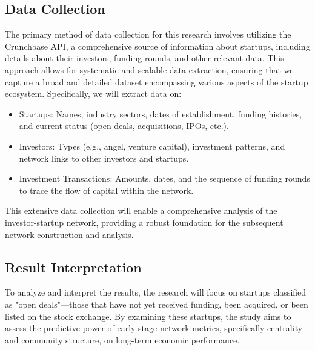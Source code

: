 \documentclass[a4paper,11pt]{article}
\begin{document}
\subsection{Data Collection}
The primary method of data collection for this research involves utilizing the Crunchbase API, a comprehensive source of information about startups, including details about their investors, funding rounds, and other relevant data. This approach allows for systematic and scalable data extraction, ensuring that we capture a broad and detailed dataset encompassing various aspects of the startup ecosystem. Specifically, we will extract data on:
\begin{itemize}
    \item Startups: Names, industry sectors, dates of establishment, funding histories, and current status (open deals, acquisitions, IPOs, etc.).
    \item Investors: Types (e.g., angel, venture capital), investment patterns, and network links to other investors and startups.
    \item Investment Transactions: Amounts, dates, and the sequence of funding rounds to trace the flow of capital within the network.
\end{itemize}

This extensive data collection will enable a comprehensive analysis of the investor-startup network, providing a robust foundation for the subsequent network construction and analysis.

\subsection{Result Interpretation}
To analyze and interpret the results, the research will focus on startups classified as "open deals"—those that have not yet received funding, been acquired, or been listed on the stock exchange. By examining these startups, the study aims to assess the predictive power of early-stage network metrics, specifically centrality and community structure, on long-term economic performance.
\end{document}
